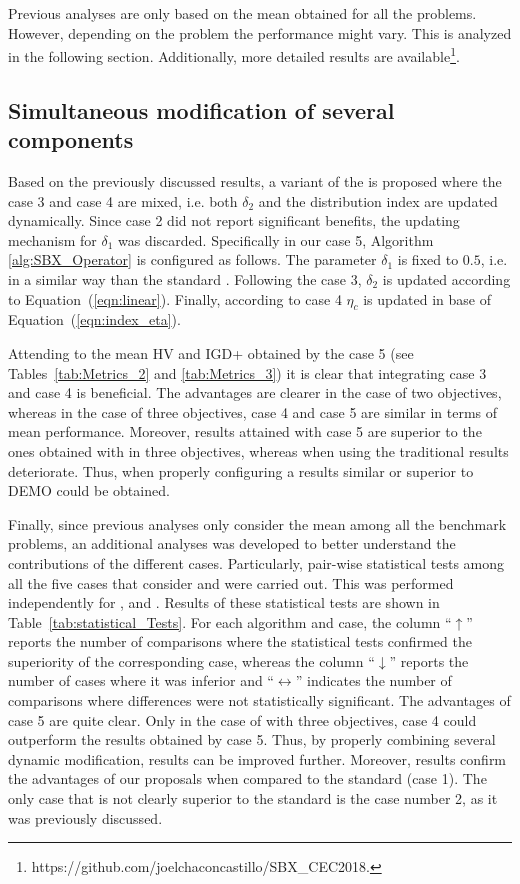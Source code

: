 Previous analyses are only based on the mean obtained for all the problems.
%
However, depending on the problem the performance might vary.
%
This is analyzed in the following section.
%
Additionally, more detailed results are available\footnote{https:\//\//github.com\//joelchaconcastillo\//SBX\_CEC2018.}.


\subsection{Simultaneous modification of several components}

Based on the previously discussed results, a variant of the \SBX{} is proposed where the case 3 and case 4 are mixed, 
i.e. both $\delta_2$ and the distribution index are updated dynamically.
%
Since case 2 did not report significant benefits, the updating mechanism for $\delta_1$ was discarded.
%
Specifically in our case 5, Algorithm \ref{alg:SBX_Operator} is configured as follows.
%
The parameter $\delta_1$ is fixed to $0.5$, i.e. in a similar way than the standard \SBX{}.
%
Following the case 3, $\delta_2$ is updated according to Equation~(\ref{eqn:linear}).
%
Finally, according to case 4 $\eta_c$ is updated in base of Equation~(\ref{eqn:index_eta}).

Attending to the mean HV and IGD+ obtained by the case 5 (see Tables~\ref{tab:Metrics_2} and \ref{tab:Metrics_3})
it is clear that integrating case 3 and case 4 is beneficial.
%
The advantages are clearer in the case of two objectives, whereas in the case of three objectives, case 4
and case 5 are similar in terms of mean performance.
%
Moreover, results attained with case 5 are superior to the ones obtained with \DE{} in three objectives, whereas
when using the traditional \SBX{} results deteriorate.
%
Thus, when properly configuring a \DSBX{} results similar or superior to DEMO could be obtained.

Finally, since previous analyses only consider the mean among all the benchmark problems, an additional analyses
was developed to better understand the contributions of the different cases.
%
Particularly, pair-wise statistical tests among all the five cases that consider \SBX{} and \DSBX{} were carried out.
%
This was performed independently for \NSGAII{}, \MOEAD{} and \SMSEMOA{}.
%
Results of these statistical tests are shown in Table~\ref{tab:statistical_Tests}.
%
For each algorithm and case, the column ``$\uparrow$'' reports the number of comparisons where the statistical tests 
confirmed the superiority of the corresponding case, whereas the column ``$\downarrow$'' reports the number of cases 
where it was inferior and ``$\longleftrightarrow$'' indicates the number of comparisons where 
differences were not statistically significant.
The advantages of case 5 are quite clear.
%
Only in the case of \NSGAII{} with three objectives, case 4 could outperform the results obtained by case 5.
%
Thus, by properly combining several dynamic modification, results can be improved further.
%
Moreover, results confirm the advantages of our proposals when compared to the standard \SBX{} (case 1).
%
The only case that is not clearly superior to the standard \SBX{} is the case number 2, as it was previously discussed.
%


